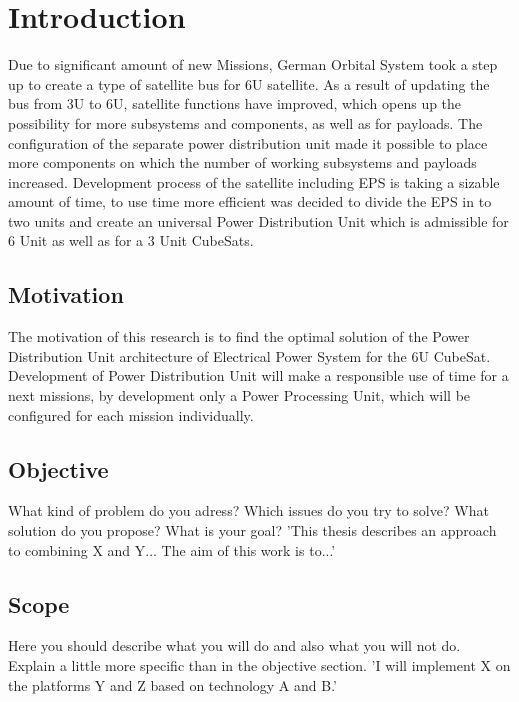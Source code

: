 \chapter{Introduction\label{cha:chapter1}}
Due to significant amount of new Missions, German Orbital System took a step up to create a type of satellite bus for 6U satellite.  As a result of updating the bus from 3U to 6U, satellite functions have improved, which opens up the possibility for more subsystems and components, as well as for payloads. The configuration of the separate power distribution unit made it possible to place more components on which the number of working subsystems and payloads increased. Development process of the satellite including EPS is taking a sizable amount of time, to use time more efficient was decided to divide the EPS in to two units and create an universal Power Distribution Unit which is admissible for 6 Unit as well as for a 3 Unit CubeSats. 
 

\section{Motivation\label{sec:moti}}

The motivation of this research is to find the optimal solution of the Power Distribution Unit architecture of Electrical Power System for the 6U CubeSat. Development of Power Distribution Unit will make a responsible use of time for a next missions, by development only a Power Processing Unit, which will be configured for each mission individually.

\section{Objective\label{sec:objective}}

What kind of problem do you adress? Which issues do you try to solve? What solution do you propose? What is your goal?
'This thesis describes an approach to combining X and Y... The aim of this work is to...'

\section{Scope\label{sec:scope}}

Here you should describe what you will do and also what you will not do. Explain a little more specific than in the objective section. 'I will implement X on the platforms Y and Z based on technology A and B.'


